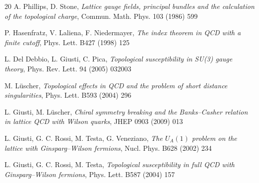 \begin{thebibliography}{20}
A. Phillips, D. Stone, \textit{Lattice gauge fields,
principal bundles and the calculation of the topological charge},
Commun. Math. Phys. 103 (1986) 599

P. Hasenfratz, V. Laliena, F. Niedermayer,
\textit{The index theorem in QCD with a finite cutoff},
Phys. Lett. B427 (1998) 125

L. Del Debbio, L. Giusti, C. Pica,
\textit{Topological susceptibility in SU(3) gauge theory},
Phys. Rev. Lett. 94 (2005) 032003

M. L\"uscher,
\textit{Topological effects in QCD and the
problem of short distance singularities},
Phys. Lett. B593 (2004) 296

L. Giusti, M. L\"uscher,
\textit{Chiral symmetry breaking and the Banks--Casher relation
in lattice QCD with Wilson quarks},
JHEP 0903 (2009) 013

L. Giusti, G. C. Rossi, M. Testa, G. Veneziano,
\textit{The $U_A(1)$ problem on the lattice with Ginsparg--Wilson fermions},
Nucl. Phys. B628 (2002) 234

L. Giusti, G. C. Rossi, M. Testa,
\textit{Topological susceptibility in full QCD with Ginsparg--Wilson fermions},
Phys. Lett. B587 (2004) 157

\end{thebibliography}



